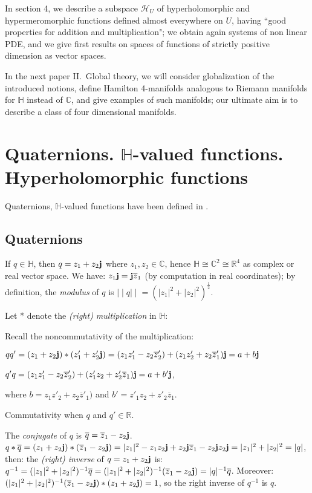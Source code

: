 \documentclass[12pt]{amsart}
\theoremstyle{definition}
\begin{document}
In section 4, we describe a subspace ${\mathcal H}_U$ of hyperholomorphic and hypermeromorphic functions defined almost everywhere on $U$, having ``good properties for addition and multiplication"; we obtain again systems of non linear PDE, and we give first results on spaces of functions of strictly positive dimension as vector spaces. 

                        
In the next paper II.\ Global theory, we will consider globalization of the introduced notions, define Hamilton 4-manifolds analogous to Riemann manifolds for ${\mathbb H}$ instead of ${\mathbb{C}}$, and give examples of such manifolds; our ultimate aim is to describe a class of four dimensional manifolds.

\section{Quaternions. ${\mathbb H}$-valued functions. Hyperholomorphic functions}
Quaternions, ${\mathbb H}$-valued functions have been defined in \cite{CLSSS 07}. 
\subsection {Quaternions} If $q\in{\mathbb H}$, then $q=z_1+z_2{\bf j}$ where $z_1, z_2\in{\mathbb{C}}$, 
hence ${\mathbb H}\cong{\mathbb{C}}^2\cong{\mathbb R}^4$ as complex or real vector space. We have:
$z_1{\bf j}={\bf j}\overline z_1$ (by computation in real coordinates); by definition, the {\it modulus} of $q$ is ${\mid\!\mid} q{\mid\!\mid}=({\vert z_1\vert} ^2+{\vert z_2\vert} ^2)^{\frac{1}{2}}$.

Let
* denote the {\it (right) multiplication} in ${\mathbb H}$: 

Recall the noncommutativity of the multiplication: 

$qq'=(z_1+z_2{\bf j})*(z'_1+z'_2{\bf j})=(z_1z'_1-z_2\overline z'_2)+(z_1z'_2+z_2\overline z'_1){\bf j}=a+b{\bf j}$ 

$q'q= (z_1z'_1-z_2\overline z'_2)+(z'_1z_2+z'_2\overline z_1){\bf j}=a+ b'{\bf j}$, 

where $b=z_1z'_2+z_2\overline z'_1)$ and $b'=z'_1z_2+z'_2\overline z_1$. 

Commutativity when $q$ and $q' \in {\mathbb R}$.

The {\it conjugate} of $q$ is $\overline q= \overline z_1-z_2{\bf j}$. 
$q*\overline q=(z_1+z_2{\bf
j})*(\overline z_1-z_2{\bf j})=\vert z_1\vert ^2-z_1z_2{\bf j}+z_2{\bf
j}\overline z_1-z_2{\bf j}z_2{\bf j}=\vert z_1\vert ^2+\vert z_2\vert ^2=\vert q\vert$,
then: the {\it (right) inverse} of $q=z_1+z_2{\bf j}$ is: $q^{-1}=(\vert z_1\vert ^2+\vert
z_2\vert ^2)^{-1}\overline q=(\vert z_1\vert ^2+\vert
z_2\vert ^2)^{-1}(\overline z_1-z_2{\bf j})=\vert q\vert^{-1}\overline q$. Moreover: $(\vert z_1\vert ^2+\vert
z_2\vert ^2)^{-1}(\overline z_1-z_2{\bf j})*(z_1+z_2{\bf j})=1$, so the right inverse of $q^{-1}$ is $q$. 
\end{document}
